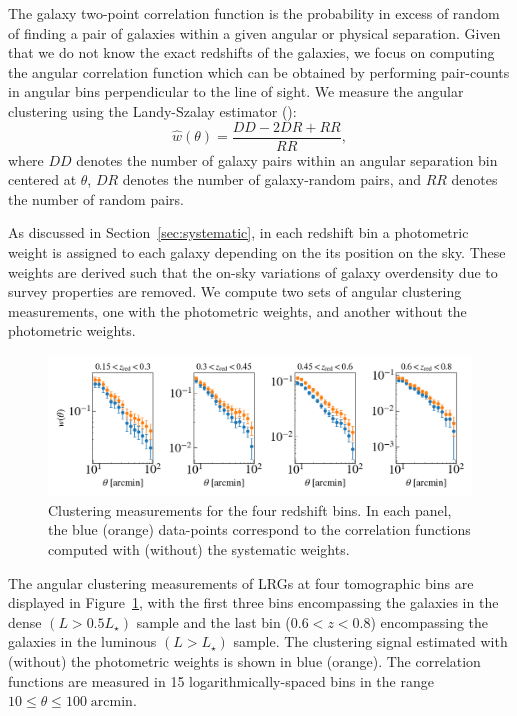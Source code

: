 \documentclass[fleqn,usenatbib,useAMS]{mnras}
\begin{document}
The galaxy two-point correlation function is the probability in excess of random of finding a pair of galaxies within a given angular or physical separation. Given that we do not know the exact redshifts of the galaxies, we focus on computing the angular correlation function which can be obtained by performing pair-counts in angular bins perpendicular to the line of sight. We measure the angular clustering using the Landy-Szalay estimator (\citealt{landy}):
\begin{equation}
    \hat{w}(\theta) = \frac{DD-2DR+RR}{RR},
\label{eq:landy}
\end{equation}
where $DD$ denotes the number of galaxy pairs within an angular separation bin centered at $\theta$, $DR$ denotes the number of galaxy-random pairs, and $RR$ denotes the number of random pairs. 

As discussed in Section~\ref{sec:systematic}, in each redshift bin a photometric weight is assigned to each galaxy depending on the its position on the sky. These weights are derived such that the on-sky variations of galaxy overdensity due to survey properties are removed. We compute two sets of angular clustering measurements, one with the photometric weights, and another without the photometric weights. 

\begin{figure}
\includegraphics[width=\textwidth]{figures_tmp/woftheta.png}
\caption{\label{fig:xi} Clustering measurements for the four redshift bins. In each panel, the blue (orange) data-points correspond to the correlation functions computed with (without) the systematic weights.} 
\end{figure}

The angular clustering measurements of LRGs at four tomographic bins are displayed in Figure~\ref{fig:xi}, with the first three bins encompassing the galaxies in the dense $(L> 0.5L_{\star})$ sample and the last bin ($0.6<z<0.8$) encompassing the galaxies in the luminous $(L> L_{\star})$ sample. The clustering signal estimated with (without) the photometric weights is shown in blue (orange). The correlation functions are measured in 15 logarithmically-spaced bins in the range $ 10\leq \theta \leq 100 \; \mathrm{arcmin}$. 
\end{document}
